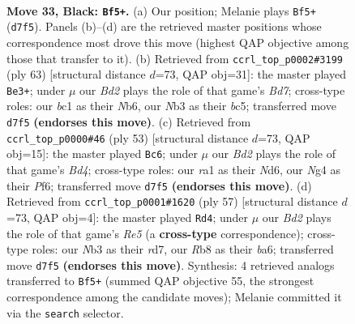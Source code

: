 \documentclass[11pt]{article}
\begin{document}
\clearpage

\begin{figure}[p]\centering
\begin{subfigure}{0.46\textwidth}\centering
\resizebox{\linewidth}{!}{%
\newchessgame
\chessboard[
  setfen={1r4k1/p1pb1pp1/7p/4r2P/p1P3n1/1n1K4/6R1/R1B2BN1 b - - 0 33},
  showmover=false,
  pgfstyle=straightmove, color=movearrow, markmove={d7-f5}
]}
\caption{}
\end{subfigure}\hfill
\begin{subfigure}{0.46\textwidth}\centering
\resizebox{\linewidth}{!}{%
\newchessgame
\chessboard[
  setfen={7k/1pN3p1/1n1r3p/p1Bn4/7P/P5PB/3br3/1R1R2K1 b - - 2 32},
  showmover=false,
  pgfstyle=straightmove, color=movearrow, markmove={d2-e3}
]}
\caption{}
\end{subfigure}
\\[4pt]
\begin{subfigure}{0.46\textwidth}\centering
\resizebox{\linewidth}{!}{%
\newchessgame
\chessboard[
  setfen={r6r/ppp2k2/3npp2/3b4/3P1BP1/8/PP2B2P/2R1K1R1 b - - 2 27},
  showmover=false,
  pgfstyle=straightmove, color=movearrow, markmove={d5-c6}
]}
\caption{}
\end{subfigure}\hfill
\begin{subfigure}{0.46\textwidth}\centering
\resizebox{\linewidth}{!}{%
\newchessgame
\chessboard[
  setfen={5rk1/p2R1p2/Bp4pp/4bn2/4r3/1P5P/3B1PP1/2R3K1 b - - 1 29},
  showmover=false,
  pgfstyle=straightmove, color=movearrow, markmove={e4-d4}
]}
\caption{}
\end{subfigure}
\caption{\textbf{Move 33, Black: \texttt{Bf5+}.} (a) Our position; Melanie plays \texttt{Bf5+} (\texttt{d7f5}). Panels (b)--(d) are the retrieved master positions whose correspondence most drove this move (highest QAP objective among those that transfer to it). (b) Retrieved from \texttt{ccrl\_top\_p0002\#3199} (ply 63) [structural distance $d$=73, QAP obj=31]: the master played \texttt{Be3+}; under $\mu$ our \emph{Bd2} plays the role of that game's \emph{Bd7}; cross-type roles: our \emph{b}c1 as their \emph{N}b6, our \emph{N}b3 as their \emph{b}c5; transferred move \texttt{d7f5} \textbf{(endorses this move)}. (c) Retrieved from \texttt{ccrl\_top\_p0000\#46} (ply 53) [structural distance $d$=73, QAP obj=15]: the master played \texttt{Bc6}; under $\mu$ our \emph{Bd2} plays the role of that game's \emph{Bd4}; cross-type roles: our \emph{r}a1 as their \emph{N}d6, our \emph{N}g4 as their \emph{P}f6; transferred move \texttt{d7f5} \textbf{(endorses this move)}. (d) Retrieved from \texttt{ccrl\_top\_p0001\#1620} (ply 57) [structural distance $d$=73, QAP obj=4]: the master played \texttt{Rd4}; under $\mu$ our \emph{Bd2} plays the role of that game's \emph{Re5} (a \textbf{cross-type} correspondence); cross-type roles: our \emph{N}b3 as their \emph{r}d7, our \emph{R}b8 as their \emph{b}a6; transferred move \texttt{d7f5} \textbf{(endorses this move)}. Synthesis: 4 retrieved analogs transferred to \texttt{Bf5+} (summed QAP objective 55, the strongest correspondence among the candidate moves); Melanie committed it via the \texttt{search} selector.}
\label{fig:thought-m65}
\end{figure}
\end{document}
